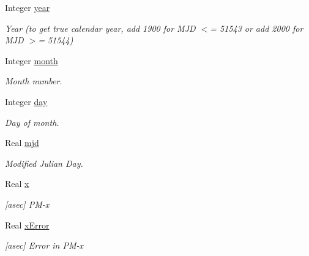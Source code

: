 \begin{DoxyCompactItemize}
\item 
Integer \hyperlink{structlibrary_1_1physics_1_1coord_1_1frame_1_1provider_1_1iers_1_1_bulletin_a_1_1_observation_afc549f7fa2ee697173fbf496dd3166f8}{year}
\begin{DoxyCompactList}\small\item\em Year (to get true calendar year, add 1900 for M\+JD $<$= 51543 or add 2000 for M\+JD $>$= 51544) \end{DoxyCompactList}\item 
Integer \hyperlink{structlibrary_1_1physics_1_1coord_1_1frame_1_1provider_1_1iers_1_1_bulletin_a_1_1_observation_a3652c79f83daa65142b894331fa06201}{month}
\begin{DoxyCompactList}\small\item\em Month number. \end{DoxyCompactList}\item 
Integer \hyperlink{structlibrary_1_1physics_1_1coord_1_1frame_1_1provider_1_1iers_1_1_bulletin_a_1_1_observation_a46330732f314a4ad4e64da78b1225f3b}{day}
\begin{DoxyCompactList}\small\item\em Day of month. \end{DoxyCompactList}\item 
Real \hyperlink{structlibrary_1_1physics_1_1coord_1_1frame_1_1provider_1_1iers_1_1_bulletin_a_1_1_observation_aa83adac6a238663a17d1f7d99abbc2a0}{mjd}
\begin{DoxyCompactList}\small\item\em Modified Julian Day. \end{DoxyCompactList}\item 
Real \hyperlink{structlibrary_1_1physics_1_1coord_1_1frame_1_1provider_1_1iers_1_1_bulletin_a_1_1_observation_a36d92dc4fd4737641942b2534b7e43f5}{x}
\begin{DoxyCompactList}\small\item\em \mbox{[}asec\mbox{]} P\+M-\/x \end{DoxyCompactList}\item 
Real \hyperlink{structlibrary_1_1physics_1_1coord_1_1frame_1_1provider_1_1iers_1_1_bulletin_a_1_1_observation_a92eb94e4ccb8ec683f4d52bb34f425cb}{x\+Error}
\begin{DoxyCompactList}\small\item\em \mbox{[}asec\mbox{]} Error in P\+M-\/x \end{DoxyCompactList}\item 

\end{DoxyCompactItemize}
